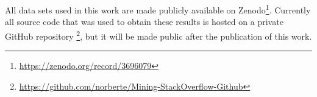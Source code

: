         All data sets used in this work are made publicly available on Zenodo\footnote{\url{https://zenodo.org/record/3696079}}. Currently all source code that was used to obtain these results is hosted on a private GitHub repository \footnote{\url{https://github.com/norberte/Mining-StackOverflow-Github}}, but it will be made public after the publication of this work. 